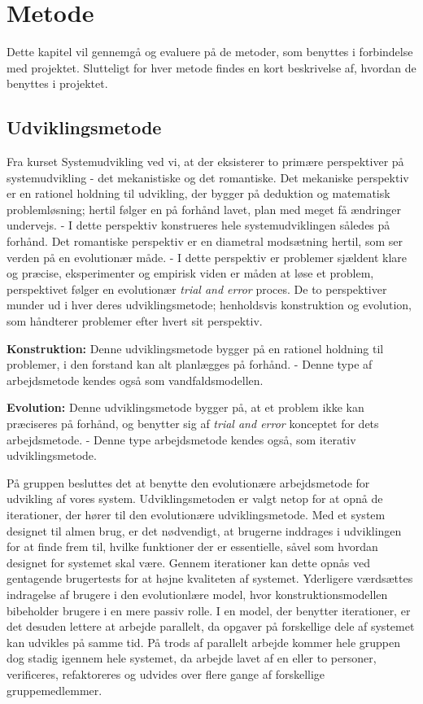 \chapter{Metode}\label{chapter:Metode}

Dette kapitel vil gennemgå og evaluere på de metoder, som benyttes i forbindelse med projektet.
Slutteligt for hver metode findes en kort beskrivelse af, hvordan de benyttes i projektet.

\section{Udviklingsmetode}\label{s:udviklingsmetode}
Fra kurset Systemudvikling ved vi, at der eksisterer to primære perspektiver på systemudvikling - det mekanistiske og det romantiske.
Det mekaniske perspektiv er en rationel holdning til udvikling, der bygger på deduktion og matematisk problemløsning; hertil følger en på forhånd lavet, plan med meget få ændringer undervejs.
- I dette perspektiv konstrueres hele systemudviklingen således på forhånd.
Det romantiske perspektiv er en diametral modsætning hertil, som ser verden på en evolutionær måde.
- I dette perspektiv er problemer sjældent klare og præcise, eksperimenter og empirisk viden er måden at løse et problem, perspektivet følger en evolutionær \textit{trial and error} proces.
De to perspektiver munder ud i hver deres udviklingsmetode; henholdsvis konstruktion og evolution, som håndterer problemer efter hvert sit perspektiv.\citep{CIC}

\textbf{Konstruktion:}
Denne udviklingsmetode bygger på en rationel holdning til problemer, i den forstand kan alt planlægges på forhånd. 
- Denne type af arbejdsmetode kendes også som vandfaldsmodellen.

\textbf{Evolution:}
Denne udviklingsmetode bygger på, at et problem ikke kan præciseres på forhånd, og benytter sig af \textit{trial and error} konceptet for dets arbejdsmetode. 
- Denne type arbejdsmetode kendes også, som iterativ udviklingsmetode.

På gruppen besluttes det at benytte den evolutionære arbejdsmetode for udvikling af vores system. 
Udviklingsmetoden er valgt netop for at opnå de iterationer, der hører til den evolutionære udviklingsmetode. 
Med et system designet til almen brug, er det nødvendigt, at brugerne inddrages i udviklingen for at finde frem til, hvilke funktioner der er essentielle, såvel som hvordan designet for systemet skal være. 
Gennem iterationer kan dette opnås ved gentagende brugertests for at højne kvaliteten af systemet. 
Yderligere værdsættes indragelse af brugere i den evolutionlære model, hvor konstruktionsmodellen bibeholder brugere i en mere passiv rolle.
I en model, der benytter iterationer, er det desuden lettere at arbejde parallelt, da opgaver på forskellige dele af systemet kan udvikles på samme tid.
På trods af parallelt arbejde kommer hele gruppen dog stadig igennem hele systemet, da arbejde lavet af en eller to personer, verificeres, refaktoreres og udvides over flere gange af forskellige gruppemedlemmer.

